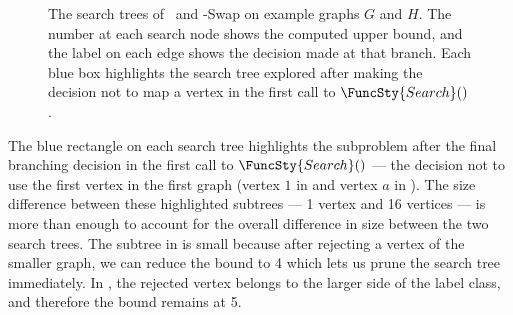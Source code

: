 \begin{figure}[htb]
    \centering
    \caption{The search trees of \McSplit\ and \McSplit-Swap on example graphs $G$ and $H$.  The number
            at each search node shows the computed upper bound, and the label on each edge shows the decision
            made at that branch.  Each blue box
            highlights the search tree explored after making the decision not to map a vertex in the first
            call to $\FuncSty{Search}()$.}
        \label{figure:search-trees-with-swapping}
\end{figure}

The blue rectangle on each search tree highlights the subproblem after the final branching
decision in the first call to $\FuncSty{Search}()$ --- the decision not to use the first
vertex in the first graph (vertex $1$ in 
and vertex $a$ in ).  The size difference between
these highlighted subtrees --- 1 vertex and 16 vertices --- is more than enough to account
for the overall difference in size between the two search trees.  The subtree in
 is small because after rejecting a vertex of
the smaller graph, we can reduce the bound to 4 which lets us prune the search tree immediately.
In , the rejected vertex belongs to the larger
side of the label class, and therefore the bound remains at 5.

